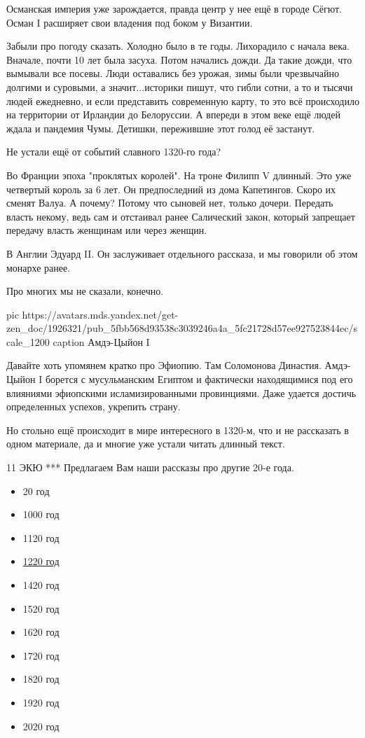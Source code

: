 Османская империя уже зарождается, правда центр у нее ещё в городе Сёгют. Осман
I расширяет свои владения под боком у Византии.

Забыли про погоду сказать. Холодно было в те годы. Лихорадило с начала века.
Вначале, почти 10 лет была засуха. Потом начались дожди. Да такие дожди, что
вымывали все посевы. Люди оставались без урожая, зимы были чрезвычайно долгими
и суровыми, а значит...историки пишут, что гибли сотни, а то и тысячи людей
ежедневно, и если представить современную карту, то это всё происходило на
территории от Ирландии до Белоруссии. А впереди в этом веке ещё людей ждала и
пандемия Чумы. Детишки, пережившие этот голод её застанут.

Не устали ещё от событий славного 1320-го года?

Во Франции эпоха "проклятых королей". На троне Филипп V длинный. Это уже
четвертый король за 6 лет. Он предпоследний из дома Капетингов. Скоро их сменят
Валуа. А почему? Потому что сыновей нет, только дочери. Передать власть некому,
ведь сам и отстаивал ранее Салический закон, который запрещает передачу власть
женщинам или через женщин.

В Англии Эдуард II. Он заслуживает отдельного рассказа, и мы говорили об этом
монархе ранее.

Про многих мы не сказали, конечно. 

\ifcmt
pic https://avatars.mds.yandex.net/get-zen_doc/1926321/pub_5fbb568d93538c3039246a4a_5fc21728d57ee927523844ec/scale_1200
caption Амдэ-Цыйон I
\fi

Давайте хоть упомянем кратко про Эфиопию. Там Соломонова Династия. Амдэ-Цыйон I
борется с мусульманским Египтом и фактически находящимися под его влияниями
эфиопскими исламизированными провинциями. Даже удается достичь определенных
успехов, укрепить страну.

Но стольно ещё происходит в мире интересного в 1320-м, что и не рассказать в
одном материале, да и многие уже устали читать длинный текст. 

11 ЭКЮ
***
Предлагаем Вам наши рассказы про другие 20-е года.
\begin{itemize}
  \item 20 год
  \item 1000 год
  \item 1120 год
	\item \href{https://zen.yandex.ru/media/11ecu/eto-byl-1220i-ili-800-let-tomu-nazad-5f4b516711a7d1138b0d7c80?integration=morda_zen_lib&place=export}{1220 год}
  \item 1420 год
  \item 1520 год
  \item 1620 год
  \item 1720 год
  \item 1820 год
  \item 1920 год
  \item 2020 год
\end{itemize}
